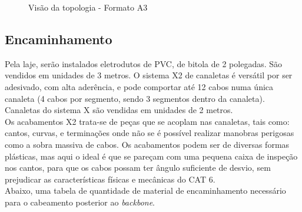 \documentclass[	DIV=calc,%
							paper=a4,%
							fontsize=12pt,%
							onecolumn]{scrartcl}	 					%
\begin{document}
\begin{figure}
	\noindent{}
	\caption{Visão da topologia - Formato A3}
	\label{fig1}
\end{figure}

\clearpage
{}
\recalctypearea


\subsection{Encaminhamento}
\vspace{14pt}
Pela laje, serão instalados eletrodutos de PVC, de bitola de 2 polegadas. São vendidos em unidades de 3 metros. O sistema X2 de canaletas é versátil por ser adesivado, com alta aderência, e pode comportar até 12 cabos numa única canaleta (4 cabos por segmento, sendo 3 segmentos dentro da canaleta). Canaletas do sistema X são vendidas em unidades de 2 metros.
\\

Os acabamentos X2 trata-se de peças que se acoplam nas canaletas, tais como: cantos, curvas, e terminações onde não se é possível realizar manobras perigosas como a sobra massiva de cabos. Os acabamentos podem ser de diversas formas plásticas, mas aqui o ideal é que se pareçam com uma pequena caixa de inspeção nos cantos, para que os cabos possam ter ângulo suficiente de desvio, sem prejudicar as características físicas e mecânicas do CAT 6.
\\

Abaixo, uma tabela de quantidade de material de encaminhamento necessário para o cabeamento posterior ao \textit{backbone}.
\\
\end{document}
